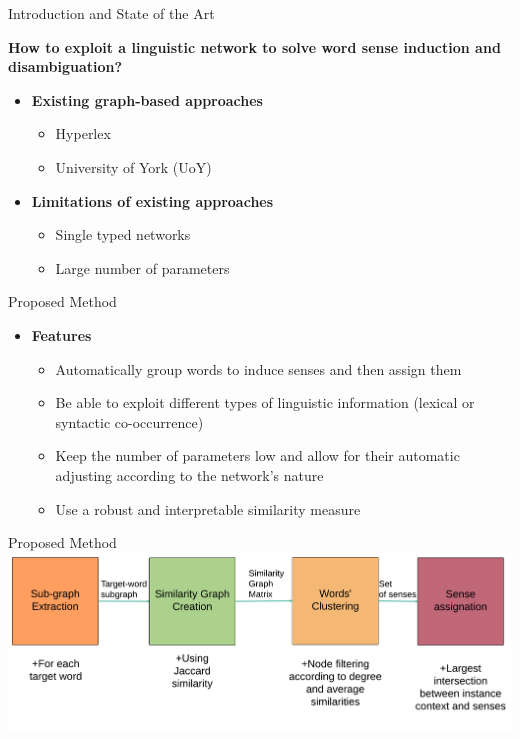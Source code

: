 \documentclass[10pt,xcolor=table]{beamer}
\begin{document}
\begin{frame}{Introduction and State of the Art}

	\large  \textbf{How to exploit a linguistic network to solve word sense induction and disambiguation?}
	\vspace{.5cm}
	\normalsize
	\begin{itemize}
		\item \textbf{Existing graph-based approaches}
			\begin{itemize}
				\item Hyperlex \cite{2004.Veronis}
				\item University of York (UoY) \cite{2007.Klapaftis.UOY}
			\end{itemize}
		\item \textbf{Limitations of existing approaches}
		\begin{itemize}
			\item Single typed networks
			\item Large number of parameters
		\end{itemize}
	
	
\end{itemize}
\vspace{\textheight}	
\end{frame}






\begin{frame}{Proposed Method}
\begin{itemize}

	\item \textbf{Features}
		\begin{itemize}
				\item Automatically group words to induce senses and then assign them
				\item Be able to exploit different types of linguistic information (lexical or syntactic co-occurrence)
				\item Keep  the number of parameters low and allow for their automatic adjusting according to the network's nature
				\item Use a robust and interpretable similarity measure
		
		\end{itemize}
	
	
\end{itemize}
\end{frame}


\begin{frame}{Proposed Method}
  \centering
  \includegraphics[width=1\linewidth]{img/wsd_wsi.png}

\end{frame}
\end{document}
